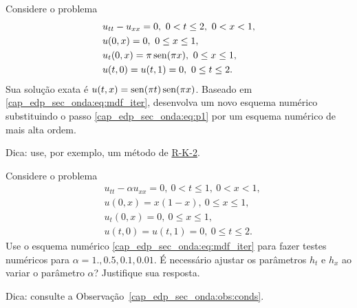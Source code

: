 \begin{exer}
  Considere o problema
  \begin{subequations}
    \begin{align}
      &u_{tt} - u_{xx} = 0, ~0 < t \leq 2, ~0< x < 1,\\
      &u(0,x) = 0, ~0\leq x \leq 1,\\
      &u_t(0,x) = \pi\operatorname{sen}(\pi x), ~0\leq x \leq 1,\\
      &u(t,0) = u(t,1) = 0, ~0\leq t \leq 2.
    \end{align}
  \end{subequations}
  Sua solução exata é $u(t,x) = \operatorname{sen}(\pi t)\operatorname{sen}(\pi x)$. Baseado em \eqref{cap_edp_sec_onda:eq:mdf_iter}, desenvolva um novo esquema numérico substituindo o passo \eqref{cap_edp_sec_onda:eq:p1} por um esquema numérico de mais alta ordem.
\end{exer}
\begin{resp}
  Dica: use, por exemplo, um método de \href{https://notaspedrok.com.br/notas/MatematicaNumericaII/cap_pvi_sec_rk.html}{R-K-2}.
\end{resp}

\begin{exer}
  Considere o problema
  \begin{subequations}
    \begin{align}
      &u_{tt} - \alpha u_{xx} = 0, ~0 < t \leq 1, ~0< x < 1,\\
      &u(0,x) = x(1-x), ~0\leq x \leq 1,\\
      &u_t(0,x) = 0, ~0\leq x \leq 1,\\
      &u(t,0) = u(t,1) = 0, ~0\leq t \leq 2.
    \end{align}
  \end{subequations}
  Use o esquema numérico \eqref{cap_edp_sec_onda:eq:mdf_iter} para fazer testes numéricos para $\alpha = 1., 0.5, 0.1, 0.01$. É necessário ajustar os parâmetros $h_t$ e $h_x$ ao variar o parâmetro $\alpha$? Justifique sua resposta.
\end{exer}
\begin{resp}
  Dica: consulte a Observação~\ref{cap_edp_sec_onda:obs:conds}.
\end{resp}